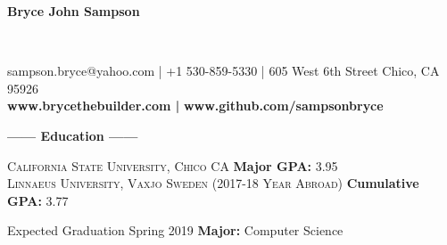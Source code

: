 \documentclass[12pt]{article}
\begin{document}
\sffamily
\lsstyle
\color{white}
\center
\begin{Huge}\textbf{Bryce John Sampson}\end{Huge}\\
\medskip
\fontsize{12}{1.2}
\selectfont
\smallbreak
\colorbox{accent}{
    \parbox{45em}{
        \centering
        \color{secondary}
        sampson.bryce@yahoo.com | +1 530-859-5330 | 605 West 6th Street Chico, CA 95926 \\
        \large
        \textbf{\color{primary}www.brycethebuilder.com |}
        \textbf{\color{primary}www.github.com/sampsonbryce}
    }
}
\smallskip
\center
\textbf{\Large------ Education ------}\\
\flushleft
\begin{footnotesize}
\textsc{California State University, Chico CA}
\hfill
\textbf{\color{primary}Major GPA: }3.95\\

\smallskip
\textsc{Linnaeus University, Vaxjo Sweden (2017-18 Year Abroad)}
\hfill
\textbf{\color{primary}Cumulative GPA: }3.77\\
\smallskip

{\color{accent}Expected Graduation Spring 2019}
\hfill
\textbf{\color{primary}Major: }Computer Science\\
\smallskip

\end{footnotesize}
\end{document}
